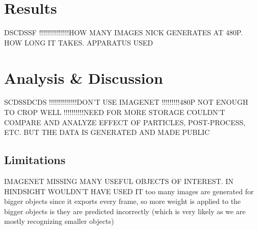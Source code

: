 \section{Results}
DSCDSSF
!!!!!!!!!!!!!!!HOW MANY IMAGES NICK GENERATES AT 480P. 
HOW LONG IT TAKES. 
APPARATUS USED
\section{Analysis \& Discussion}
SCDSSDCDS
!!!!!!!!!!!!!!DON'T USE IMAGENET
!!!!!!!!!480P NOT ENOUGH TO CROP WELL
!!!!!!!!!!NEED FOR MORE STORAGE
COULDN'T COMPARE AND ANALYZE EFFECT OF PARTICLES, POST-PROCESS, ETC. BUT THE DATA IS GENERATED AND MADE PUBLIC
\subsection{Limitations}
IMAGENET MISSING MANY USEFUL OBJECTS OF INTEREST. IN HINDSIGHT WOULDN'T HAVE USED IT
too many images are generated for bigger objects since it exports every frame, so more weight is applied to the bigger objects is they are predicted incorrectly (which is very likely as we are mostly recognizing smaller objects)